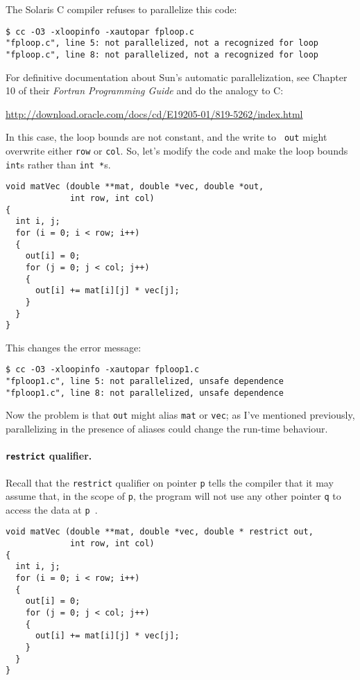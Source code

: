 The Solaris C compiler refuses to parallelize this code:
{\small 
\begin{verbatim}
$ cc -O3 -xloopinfo -xautopar fploop.c 
"fploop.c", line 5: not parallelized, not a recognized for loop
"fploop.c", line 8: not parallelized, not a recognized for loop
\end{verbatim} 
}
For definitive documentation about Sun's automatic parallelization, see
Chapter 10 of their \emph{Fortran Programming Guide} and do the analogy to C:

\url{http://download.oracle.com/docs/cd/E19205-01/819-5262/index.html}

In this case, the loop bounds are not constant, and the write to {\tt
  out} might overwrite either {\tt row} or {\tt col}. So, let's modify
the code and make the loop bounds {\tt int}s rather than {\tt int *}s.

\begin{verbatim}
void matVec (double **mat, double *vec, double *out,
             int row, int col) 
{
  int i, j;
  for (i = 0; i < row; i++)
  {
    out[i] = 0;
    for (j = 0; j < col; j++)
    {
      out[i] += mat[i][j] * vec[j];
    }
  }
}
\end{verbatim}
 This changes the error message:


\begin{verbatim}
$ cc -O3 -xloopinfo -xautopar fploop1.c 
"fploop1.c", line 5: not parallelized, unsafe dependence
"fploop1.c", line 8: not parallelized, unsafe dependence
\end{verbatim} 

Now the problem is that {\tt out} might alias {\tt mat} or {\tt vec};
as I've mentioned previously, parallelizing
in the presence of aliases could change the run-time behaviour.

\paragraph{{\tt restrict} qualifier.} 
Recall that the {\tt restrict} qualifier on pointer {\tt p} tells
the compiler that it may assume that, in the scope of {\tt p},
the program will not use any other pointer {\tt q} to access the
data at {\tt *p}~\cite{cellperf}.

{
\begin{verbatim}
void matVec (double **mat, double *vec, double * restrict out,
             int row, int col) 
{
  int i, j;
  for (i = 0; i < row; i++)
  {
    out[i] = 0;
    for (j = 0; j < col; j++)
    {
      out[i] += mat[i][j] * vec[j];
    }
  }
}
\end{verbatim}
}

